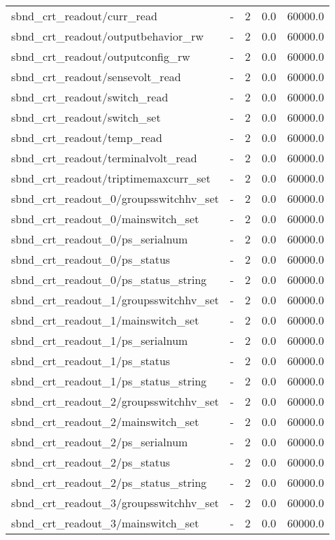 \begin{center}
\begin{longtable}{l | l l l l }
sbnd\_crt\_readout/curr\_read & - & 2 & 0.0 & 60000.0\\ 
sbnd\_crt\_readout/outputbehavior\_rw & - & 2 & 0.0 & 60000.0\\ 
sbnd\_crt\_readout/outputconfig\_rw & - & 2 & 0.0 & 60000.0\\ 
sbnd\_crt\_readout/sensevolt\_read & - & 2 & 0.0 & 60000.0\\ 
sbnd\_crt\_readout/switch\_read & - & 2 & 0.0 & 60000.0\\ 
sbnd\_crt\_readout/switch\_set & - & 2 & 0.0 & 60000.0\\ 
sbnd\_crt\_readout/temp\_read & - & 2 & 0.0 & 60000.0\\ 
sbnd\_crt\_readout/terminalvolt\_read & - & 2 & 0.0 & 60000.0\\ 
sbnd\_crt\_readout/triptimemaxcurr\_set & - & 2 & 0.0 & 60000.0\\ 
sbnd\_crt\_readout\_0/groupsswitchhv\_set & - & 2 & 0.0 & 60000.0\\ 
sbnd\_crt\_readout\_0/mainswitch\_set & - & 2 & 0.0 & 60000.0\\ 
sbnd\_crt\_readout\_0/ps\_serialnum & - & 2 & 0.0 & 60000.0\\ 
sbnd\_crt\_readout\_0/ps\_status & - & 2 & 0.0 & 60000.0\\ 
sbnd\_crt\_readout\_0/ps\_status\_string & - & 2 & 0.0 & 60000.0\\ 
sbnd\_crt\_readout\_1/groupsswitchhv\_set & - & 2 & 0.0 & 60000.0\\ 
sbnd\_crt\_readout\_1/mainswitch\_set & - & 2 & 0.0 & 60000.0\\ 
sbnd\_crt\_readout\_1/ps\_serialnum & - & 2 & 0.0 & 60000.0\\ 
sbnd\_crt\_readout\_1/ps\_status & - & 2 & 0.0 & 60000.0\\ 
sbnd\_crt\_readout\_1/ps\_status\_string & - & 2 & 0.0 & 60000.0\\ 
sbnd\_crt\_readout\_2/groupsswitchhv\_set & - & 2 & 0.0 & 60000.0\\ 
sbnd\_crt\_readout\_2/mainswitch\_set & - & 2 & 0.0 & 60000.0\\ 
sbnd\_crt\_readout\_2/ps\_serialnum & - & 2 & 0.0 & 60000.0\\ 
sbnd\_crt\_readout\_2/ps\_status & - & 2 & 0.0 & 60000.0\\ 
sbnd\_crt\_readout\_2/ps\_status\_string & - & 2 & 0.0 & 60000.0\\ 
sbnd\_crt\_readout\_3/groupsswitchhv\_set & - & 2 & 0.0 & 60000.0\\ 
sbnd\_crt\_readout\_3/mainswitch\_set & - & 2 & 0.0 & 60000.0\\ 

\end{longtable}
\end{center}
